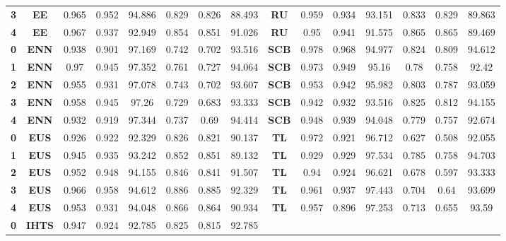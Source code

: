 {{\begin{tabular}{c|c|cccccc|ccccccc}
\textbf{3} & \textbf{EE} & 0.965 & 0.952 & 94.886 & 0.829 & 0.826 & 88.493 & \multicolumn{1}{c|}{\textbf{RU}} & 0.959 & 0.934 & 93.151 & 0.833 & 0.829 & 89.863 \\
\textbf{4} & \textbf{EE} & 0.967 & 0.937 & 92.949 & 0.854 & 0.851 & 91.026 & \multicolumn{1}{c|}{\textbf{RU}} & 0.95  & 0.941 & 91.575 & 0.865 & 0.865 & 89.469 \\
\textbf{0} & \textbf{ENN} & 0.938 & 0.901 & 97.169 & 0.742 & 0.702 & 93.516 & \multicolumn{1}{c|}{\textbf{SCB}} & 0.978 & 0.968 & 94.977 & 0.824 & 0.809 & 94.612 \\
\textbf{1} & \textbf{ENN} & 0.97  & 0.945 & 97.352 & 0.761 & 0.727 & 94.064 & \multicolumn{1}{c|}{\textbf{SCB}} & 0.973 & 0.949 & 95.16 & 0.78  & 0.758 & 92.42 \\
\textbf{2} & \textbf{ENN} & 0.955 & 0.931 & 97.078 & 0.743 & 0.702 & 93.607 & \multicolumn{1}{c|}{\textbf{SCB}} & 0.953 & 0.942 & 95.982 & 0.803 & 0.787 & 93.059 \\
\textbf{3} & \textbf{ENN} & 0.958 & 0.945 & 97.26 & 0.729 & 0.683 & 93.333 & \multicolumn{1}{c|}{\textbf{SCB}} & 0.942 & 0.932 & 93.516 & 0.825 & 0.812 & 94.155 \\
\textbf{4} & \textbf{ENN} & 0.932 & 0.919 & 97.344 & 0.737 & 0.69  & 94.414 & \multicolumn{1}{c|}{\textbf{SCB}} & 0.948 & 0.939 & 94.048 & 0.779 & 0.757 & 92.674 \\
\textbf{0} & \textbf{EUS} & 0.926 & 0.922 & 92.329 & 0.826 & 0.821 & 90.137 & \multicolumn{1}{c|}{\textbf{TL}} & 0.972 & 0.921 & 96.712 & 0.627 & 0.508 & 92.055 \\
\textbf{1} & \textbf{EUS} & 0.945 & 0.935 & 93.242 & 0.852 & 0.851 & 89.132 & \multicolumn{1}{c|}{\textbf{TL}} & 0.929 & 0.929 & 97.534 & 0.785 & 0.758 & 94.703 \\
\textbf{2} & \textbf{EUS} & 0.952 & 0.948 & 94.155 & 0.846 & 0.841 & 91.507 & \multicolumn{1}{c|}{\textbf{TL}} & 0.94  & 0.924 & 96.621 & 0.678 & 0.597 & 93.333 \\
\textbf{3} & \textbf{EUS} & 0.966 & 0.958 & 94.612 & 0.886 & 0.885 & 92.329 & \multicolumn{1}{c|}{\textbf{TL}} & 0.961 & 0.937 & 97.443 & 0.704 & 0.64  & 93.699 \\
\textbf{4} & \textbf{EUS} & 0.953 & 0.931 & 94.048 & 0.866 & 0.864 & 90.934 & \multicolumn{1}{c|}{\textbf{TL}} & 0.957 & 0.896 & 97.253 & 0.713 & 0.655 & 93.59 \\
\textbf{0} & \textbf{IHTS} & 0.947 & 0.924 & 92.785 & 0.825 & 0.815 & 92.785 &       &       &       &       &       &       &  \\

\end{tabular}}}
